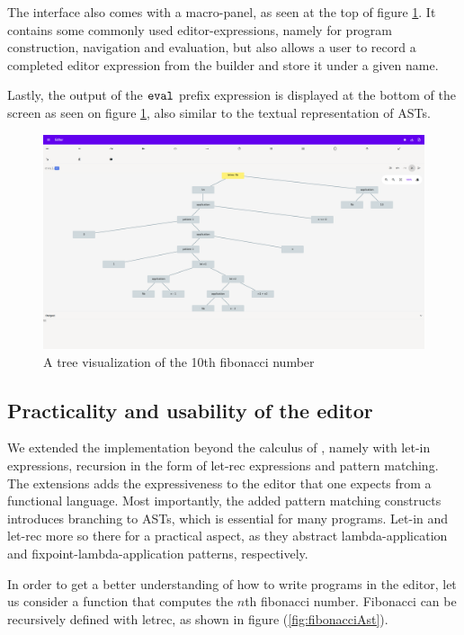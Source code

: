 The interface also comes with a macro-panel, as seen at the top of figure
\ref{fig:final_ui}. It contains some commonly used editor-expressions, namely
for program construction, navigation and evaluation, but also allows a user to
record a completed editor expression from the builder and store it under a
given name.

Lastly, the output of the $\texttt{eval}$ prefix expression is displayed at the
bottom of the screen as seen on figure \ref{fig:final_ui}, also similar to the
textual representation of ASTs.

\begin{figure}
  \begin{center}
    \includegraphics[width=1\textwidth]{assets/fibtree.png}
  \end{center}
  \caption{A tree visualization of the 10th fibonacci number}
  \label{fig:final_ui}
\end{figure}

\subsection{Practicality and usability of the editor}
\label{extensions}
We extended the implementation beyond the calculus of
\cite{10.1145/3441296.3441393}, namely with let-in expressions, recursion in
the form of let-rec expressions and pattern matching. The extensions adds the
expressiveness to the editor that one expects from a functional language. Most
importantly, the added pattern matching constructs introduces branching to
ASTs, which is essential for many programs. Let-in and let-rec more so there
for a practical aspect, as they abstract lambda-application and
fixpoint-lambda-application patterns, respectively.

In order to get a better understanding of how to write programs in the editor,
let us consider a function that computes the $n$th fibonacci number. Fibonacci
can be recursively defined with letrec, as shown in figure
(\ref{fig:fibonacciAst}).

